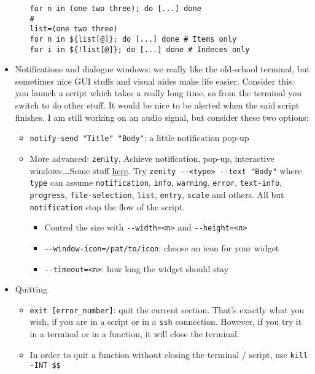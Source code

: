 \documentclass[a4paper,12pt,%
              final%
              ]{article}
\begin{document}
\begin{itemize}
\begin{itemize}
\begin{verbatim}
for n in (one two three); do [...] done
#
list=(one two three)
for n in ${list[@]}; do [...] done # Items only
for i in ${!list[@]}; do [...] done # Indeces only
\end{verbatim}
    \end{itemize}
  \item Notifications and dialogue windows: we really like the old-school terminal, but sometimes nice GUI stuffs and visual aides make life easier. Consider this: you launch a script which takes a really long time, so from the terminal you switch to do other stuff. It would be nice to be alerted when the said script finishes. I am still working on an audio signal, but consider these two options:
    \begin{itemize}
      \item \verb|notify-send "Title" "Body"|: a little notification pop-up
      \item More advanced: \verb|zenity|, Achieve notification, pop-up, interactive windows,\ldots Some stuff \href{https://renenyffenegger.ch/notes/Linux/shell/commands/zenity}{here}. Try \verb|zenity --<type> --text "Body"| where \texttt{type} can assume \texttt{notification}, \texttt{info}, \texttt{warning}, \texttt{error}, \texttt{text-info}, \texttt{progress}, \texttt{file-selection}, \texttt{list}, \texttt{entry}, \texttt{scale} and others. All but \texttt{notification} stop the flow of the script.
        \begin{itemize}
          \item Control the size with \verb|--width=<n>| and \verb|--height=<n>|
          \item \verb|--window-icon=/pat/to/icon|: choose an icon for your widget
          \item \verb|--timeout=<n>|: how long the widget should stay
        \end{itemize}
    \end{itemize}
  \item Quitting
    \begin{itemize}
      \item \verb|exit [error_number]|: quit the current section. That's exactly what you wish, if you are in a script or in a \texttt{ssh} connection. However, if you try it in a terminal or in a function, it will close the terminal.
      \item In order to quit a function without closing the terminal / script, use \verb|kill -INT $$|
    \end{itemize}

\end{itemize}
\end{document}
